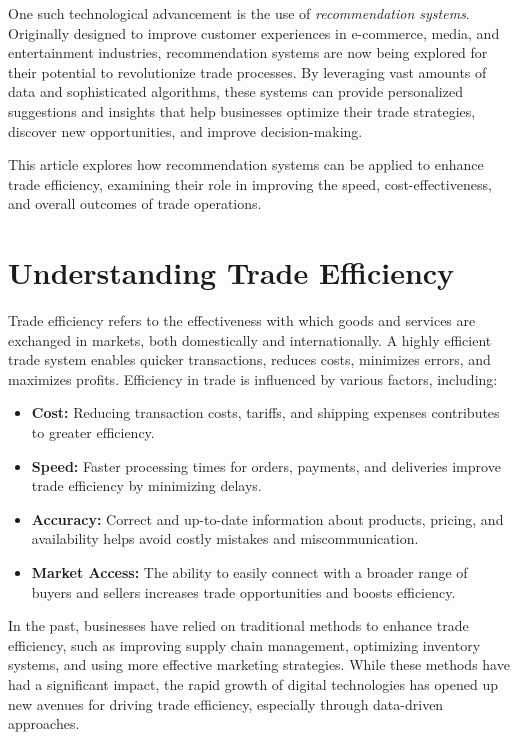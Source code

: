 \documentclass[10pt,twocolumn,twoside,slovak,a4paper]{article}
\begin{document}
One such technological advancement is the use of \textit{recommendation systems}. Originally designed to improve customer experiences in e-commerce, media, and entertainment industries, recommendation systems are now being explored for their potential to revolutionize trade processes. By leveraging vast amounts of data and sophisticated algorithms, these systems can provide personalized suggestions and insights that help businesses optimize their trade strategies, discover new opportunities, and improve decision-making.

This article explores how recommendation systems can be applied to enhance trade efficiency, examining their role in improving the speed, cost-effectiveness, and overall outcomes of trade operations.



\section{Understanding Trade Efficiency}

Trade efficiency refers to the effectiveness with which goods and services are exchanged in markets, both domestically and internationally. A highly efficient trade system enables quicker transactions, reduces costs, minimizes errors, and maximizes profits. Efficiency in trade is influenced by various factors, including:

\begin{itemize}
    \item \textbf{Cost:} Reducing transaction costs, tariffs, and shipping expenses contributes to greater efficiency.
    \item \textbf{Speed:} Faster processing times for orders, payments, and deliveries improve trade efficiency by minimizing delays.
    \item \textbf{Accuracy:} Correct and up-to-date information about products, pricing, and availability helps avoid costly mistakes and miscommunication.
    \item \textbf{Market Access:} The ability to easily connect with a broader range of buyers and sellers increases trade opportunities and boosts efficiency.
\end{itemize}

\noindent In the past, businesses have relied on traditional methods to enhance trade efficiency, such as improving supply chain management, optimizing inventory systems, and using more effective marketing strategies. While these methods have had a significant impact, the rapid growth of digital technologies has opened up new avenues for driving trade efficiency, especially through data-driven approaches.
\end{document}
